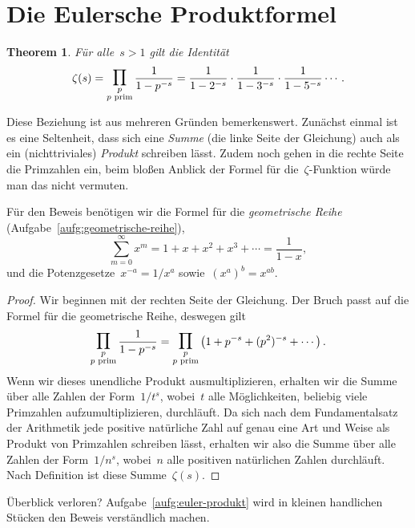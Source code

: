 \documentclass[twoside]{../zirkelblatt1415}
\theoremstyle{definition}
\theoremstyle{plain}
\newtheorem{thm}[defn]{Theorem}
\theoremstyle{remark}
\newcommand{\prim}[1]{\text{\textnormal{$#1$ prim}}}
\newcommand{\bigprod}{\mathop{\mathlarger{\mathlarger{\prod}}}}
\begin{document}
\section{Die Eulersche Produktformel}\label{sect:euler-produkt}

\begin{thm}Für alle~$s > 1$ gilt die Identität
\[ \zeta(s) = \bigprod_{\substack{p\\\prim{p}}} \frac{1}{1 - p^{-s}} =
  \frac{1}{1 - 2^{-s}} \cdot \frac{1}{1 - 3^{-s}} \cdot \frac{1}{1 - 5^{-s}} \cdots. \]
\end{thm}
Diese Beziehung ist aus mehreren Gründen bemerkenswert. Zunächst einmal ist es
eine Seltenheit, dass sich eine \emph{Summe} (die linke Seite der Gleichung)
auch als ein (nichttriviales) \emph{Produkt} schreiben lässt. Zudem noch gehen
in die rechte Seite die Primzahlen ein, beim bloßen Anblick der Formel für
die~$\zeta$-Funktion würde man das nicht vermuten.

Für den Beweis benötigen wir die Formel für die \emph{geometrische Reihe}
(Aufgabe~\ref{aufg:geometrische-reihe}),
\[ \sum_{m = 0}^\infty x^m = 1 + x + x^2 + x^3 + \cdots = \frac{1}{1 - x}, \]
und die Potenzgesetze~$x^{-a} = 1/x^a$ sowie~$(x^a)^b = x^{ab}$.

\begin{proof}Wir beginnen mit der rechten Seite der Gleichung. Der Bruch passt
auf die Formel für die geometrische Reihe, deswegen gilt
\[
  \bigprod_{\substack{p\\\prim{p}}} \frac{1}{1 - p^{-s}} =
  \bigprod_{\substack{p\\\prim{p}}} \left(1 + p^{-s} + (p^2)^{-s} + \cdots\right).
\]
Wenn wir dieses unendliche Produkt ausmultiplizieren, erhalten wir
die Summe über alle Zahlen der Form~$1/t^s$, wobei~$t$ alle Möglichkeiten,
beliebig viele Primzahlen aufzumultiplizieren, durchläuft. Da sich nach dem
Fundamentalsatz der Arithmetik jede positive natürliche Zahl auf genau eine Art
und Weise als Produkt von Primzahlen schreiben lässt, erhalten wir also die
Summe über alle Zahlen der Form~$1/n^s$, wobei~$n$ alle positiven natürlichen
Zahlen durchläuft. Nach Definition ist diese Summe~$\zeta(s)$.
\end{proof}

Überblick verloren? Aufgabe~\ref{aufg:euler-produkt} wird in kleinen handlichen
Stücken den Beweis verständlich machen.
\end{document}
